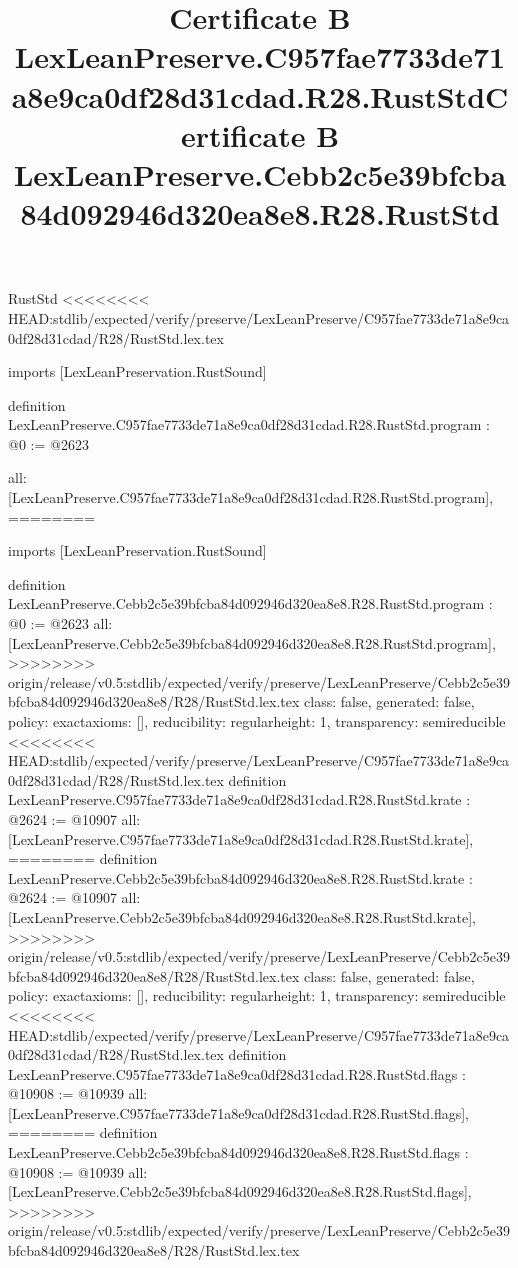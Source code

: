 \begin{lexlean}{RustStd}
<<<<<<<< HEAD:stdlib/expected/verify/preserve/LexLeanPreserve/C957fae7733de71a8e9ca0df28d31cdad/R28/RustStd.lex.tex
\title{Certificate B LexLeanPreserve.C957fae7733de71a8e9ca0df28d31cdad.R28.RustStd}
\begin{coremodule}
imports [LexLeanPreservation.RustSound]

definition LexLeanPreserve.C957fae7733de71a8e9ca0df28d31cdad.R28.RustStd.program : @0 := @2623 {
  all: [LexLeanPreserve.C957fae7733de71a8e9ca0df28d31cdad.R28.RustStd.program],
========
\title{Certificate B LexLeanPreserve.Cebb2c5e39bfcba84d092946d320ea8e8.R28.RustStd}
\begin{coremodule}
imports [LexLeanPreservation.RustSound]

definition LexLeanPreserve.Cebb2c5e39bfcba84d092946d320ea8e8.R28.RustStd.program : @0 := @2623 {
  all: [LexLeanPreserve.Cebb2c5e39bfcba84d092946d320ea8e8.R28.RustStd.program],
>>>>>>>> origin/release/v0.5:stdlib/expected/verify/preserve/LexLeanPreserve/Cebb2c5e39bfcba84d092946d320ea8e8/R28/RustStd.lex.tex
  class: false,
  generated: false,
  policy: exact{axioms: []},
  reducibility: regular{height: 1},
  transparency: semireducible
}
<<<<<<<< HEAD:stdlib/expected/verify/preserve/LexLeanPreserve/C957fae7733de71a8e9ca0df28d31cdad/R28/RustStd.lex.tex
definition LexLeanPreserve.C957fae7733de71a8e9ca0df28d31cdad.R28.RustStd.krate : @2624 := @10907 {
  all: [LexLeanPreserve.C957fae7733de71a8e9ca0df28d31cdad.R28.RustStd.krate],
========
definition LexLeanPreserve.Cebb2c5e39bfcba84d092946d320ea8e8.R28.RustStd.krate : @2624 := @10907 {
  all: [LexLeanPreserve.Cebb2c5e39bfcba84d092946d320ea8e8.R28.RustStd.krate],
>>>>>>>> origin/release/v0.5:stdlib/expected/verify/preserve/LexLeanPreserve/Cebb2c5e39bfcba84d092946d320ea8e8/R28/RustStd.lex.tex
  class: false,
  generated: false,
  policy: exact{axioms: []},
  reducibility: regular{height: 1},
  transparency: semireducible
}
<<<<<<<< HEAD:stdlib/expected/verify/preserve/LexLeanPreserve/C957fae7733de71a8e9ca0df28d31cdad/R28/RustStd.lex.tex
definition LexLeanPreserve.C957fae7733de71a8e9ca0df28d31cdad.R28.RustStd.flags : @10908 := @10939 {
  all: [LexLeanPreserve.C957fae7733de71a8e9ca0df28d31cdad.R28.RustStd.flags],
========
definition LexLeanPreserve.Cebb2c5e39bfcba84d092946d320ea8e8.R28.RustStd.flags : @10908 := @10939 {
  all: [LexLeanPreserve.Cebb2c5e39bfcba84d092946d320ea8e8.R28.RustStd.flags],
>>>>>>>> origin/release/v0.5:stdlib/expected/verify/preserve/LexLeanPreserve/Cebb2c5e39bfcba84d092946d320ea8e8/R28/RustStd.lex.tex
}}}
\end{coremodule}}
\end{coremodule}
\end{lexlean}
